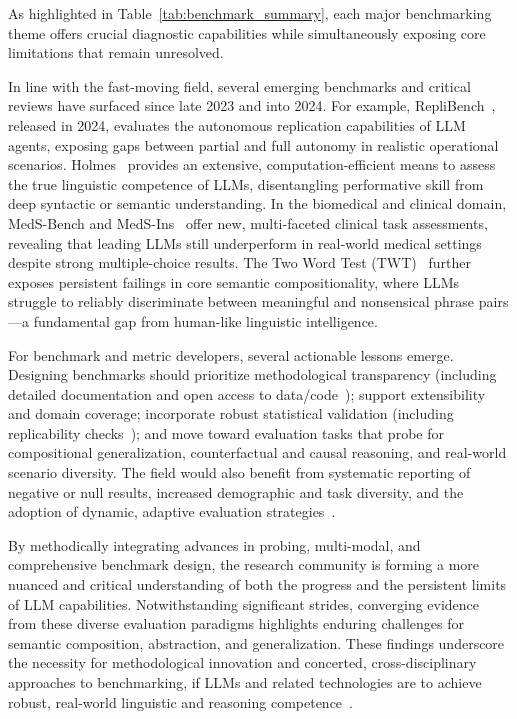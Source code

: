 \documentclass[sigconf]{acmart}
\begin{document}
As highlighted in Table~\ref{tab:benchmark_summary}, each major benchmarking theme offers crucial diagnostic capabilities while simultaneously exposing core limitations that remain unresolved.

In line with the fast-moving field, several emerging benchmarks and critical reviews have surfaced since late 2023 and into 2024. For example, RepliBench~\cite{ref23}, released in 2024, evaluates the autonomous replication capabilities of LLM agents, exposing gaps between partial and full autonomy in realistic operational scenarios. Holmes~\cite{ref97} provides an extensive, computation-efficient means to assess the true linguistic competence of LLMs, disentangling performative skill from deep syntactic or semantic understanding. In the biomedical and clinical domain, MedS-Bench and MedS-Ins~\cite{ref95} offer new, multi-faceted clinical task assessments, revealing that leading LLMs still underperform in real-world medical settings despite strong multiple-choice results. The Two Word Test (TWT)~\cite{ref96} further exposes persistent failings in core semantic compositionality, where LLMs struggle to reliably discriminate between meaningful and nonsensical phrase pairs---a fundamental gap from human-like linguistic intelligence.

For benchmark and metric developers, several actionable lessons emerge. Designing benchmarks should prioritize methodological transparency (including detailed documentation and open access to data/code~\cite{ref94, ref95, ref55}); support extensibility and domain coverage; incorporate robust statistical validation (including replicability checks~\cite{ref22, ref61}); and move toward evaluation tasks that probe for compositional generalization, counterfactual and causal reasoning, and real-world scenario diversity. The field would also benefit from systematic reporting of negative or null results, increased demographic and task diversity, and the adoption of dynamic, adaptive evaluation strategies~\cite{ref55, ref61, ref63, ref64, ref94}.

By methodically integrating advances in probing, multi-modal, and comprehensive benchmark design, the research community is forming a more nuanced and critical understanding of both the progress and the persistent limits of LLM capabilities. Notwithstanding significant strides, converging evidence from these diverse evaluation paradigms highlights enduring challenges for semantic composition, abstraction, and generalization. These findings underscore the necessity for methodological innovation and concerted, cross-disciplinary approaches to benchmarking, if LLMs and related technologies are to achieve robust, real-world linguistic and reasoning competence~\cite{ref92, ref94, ref96, ref97, ref98, ref99}.
\end{document}
